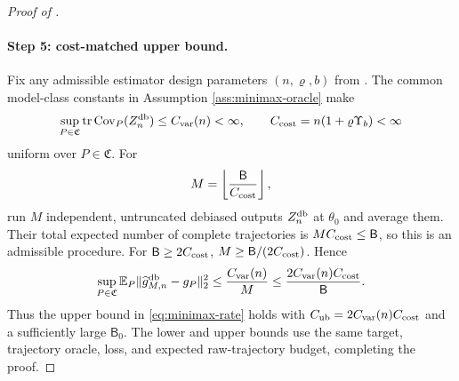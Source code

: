 \begin{proof}[Proof of ]
\paragraph{Step 5: cost-matched upper bound.}
Fix any admissible estimator design parameters $(n,\varrho,b)$ from .  The common model-class constants in Assumption \ref{ass:minimax-oracle} make
\[
 \sup_{P\in\mathfrak C}\operatorname{tr}\operatorname{Cov}_P(Z_n^{\mathrm{db}})\le C_{\rm var}(n)<\infty,
 \qquad
 C_{\rm cost}=n(1+\varrho \Upsilon_b)<\infty
\]
uniform over $P\in\mathfrak C$.  For
\[
 M=\left\lfloor\frac{\mathsf B}{C_{\rm cost}}\right\rfloor,
\]
run $M$ independent, untruncated debiased outputs $Z_n^{\mathrm{db}}$ at $\theta_0$ and average them.  Their total expected number of complete trajectories is $MC_{\rm cost}\le \mathsf B$, so this is an admissible procedure.  For $\mathsf B\ge2C_{\rm cost}$,
$M\ge \mathsf B/(2C_{\rm cost})$.  Hence
\[
 \sup_{P\in\mathfrak C}
 \mathbb E_P\lVert\widehat g_{M,n}^{\mathrm{db}}-g_P\rVert_2^2
 \le\frac{C_{\rm var}(n)}{M}
 \le\frac{2C_{\rm var}(n)C_{\rm cost}}{\mathsf B}.
\]
Thus the upper bound in \eqref{eq:minimax-rate} holds with
$C_{\rm ub}=2C_{\rm var}(n)C_{\rm cost}$ and a sufficiently large $\mathsf B_0$.  The lower and upper bounds use the same target, trajectory oracle, loss, and expected raw-trajectory budget, completing the proof.
\end{proof}
